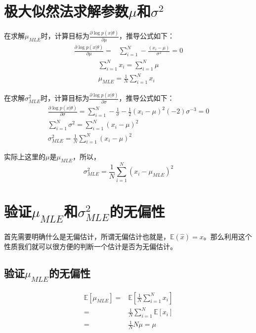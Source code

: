 \documentclass[a4paper]{article}
\begin{document}
\section{极大似然法求解参数$\mu$和$\sigma^2$}
在求解$\mu_{MLE}$时，计算目标为$\frac{\partial\log p(x|\theta)}{\partial \mu}$，推导公式如下：
\begin{align}
    \frac{\partial\log p(x|\theta)}{\partial \mu} = & \sum_{i=1}^N - \frac{(x_i-\mu)}{\sigma^2} = 0
\end{align}
\begin{gather}
    \sum_{i=1}^N x_i =  \sum_{i=1}^N \mu \\
    \mu_{MLE} =  \frac{1}{N}\sum_{i=1}^N x_i
\end{gather}

在求解$\sigma^2_{MLE}$时，计算目标为$\frac{\partial\log p(x|\theta)}{\partial \sigma}$，推导公式如下：
\begin{gather}
    \frac{\partial\log p(x|\theta)}{\partial \sigma} 
     = \sum_{i=1}^N - \frac{1}{\sigma} - \frac{1}{2}(x_i-\mu)^2(-2)\sigma^{-3} = 0 \\
     \sum_{i=1}^N  \sigma^2 = \sum_{i=1}^N (x_i-\mu)^2 \\
     \sigma^2_{MLE} = \frac{1}{N} \sum_{i=1}^N (x_i-\mu)^2 
\end{gather}

实际上这里的$\mu$是$\mu_{MLE}$，所以，
\begin{equation}
    \sigma^2_{MLE} = \frac{1}{N} \sum_{i=1}^N (x_i-\mu_{MLE})^2 
\end{equation}

\section{验证$\mu_{MLE}$和$\sigma^2_{MLE}$的无偏性}
首先需要明确什么是无偏估计，所谓无偏估计也就是，$\mathbb{E}(\hat{x})=x$。那么利用这个性质我们就可以很方便的判断一个估计是否为无偏估计。
\subsection{验证$\mu_{MLE}$的无偏性}

\begin{equation}
    \begin{split}
        \mathbb{E}[\mu_{MLE}] = & \mathbb{E}[\frac{1}{N} \sum_{i=1}^N x_i] \\
        = & \frac{1}{N} \sum_{i=1}^N \mathbb{E}[  x_i] \\
        = & \frac{1}{N} N \mu = \mu
    \end{split}
\end{equation}
\end{document}
